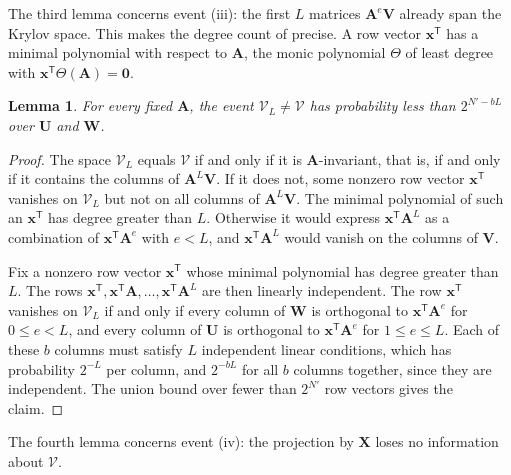 \documentclass[b5paper, 10pt, abstract=true, captions=tableheading]{scrartcl}
\theoremstyle{plain}
\newtheorem{lemma}{Lemma}
\theoremstyle{definition}
\newcommand{\tr}{\mathsf{T}}
\renewcommand{\vec}[1]{\symbf{#1}}
\newcommand{\mat}[1]{\symbf{#1}}
\begin{document}
The third lemma concerns event (iii): the first $L$ matrices
$\mat A^e\mat V$ already span the Krylov space. This makes the degree
count of  precise. A row vector $\vec x^\tr$
has a minimal polynomial with respect to $\mat A$, the monic polynomial
$\Theta$ of least degree with $\vec x^\tr\Theta(\mat A)=\vec 0$.

\begin{lemma}\label{lem:wiedemann-right}
For every fixed $\mat A$, the event $\mathcal V_L\neq\mathcal V$ has
probability less than $2^{N'-bL}$ over $\mat U$ and $\mat W$.
\end{lemma}
\begin{proof}
The space $\mathcal V_L$ equals $\mathcal V$ if and only if it is
$\mat A$-invariant, that is, if and only if it contains the columns of
$\mat A^L\mat V$. If it does not, some nonzero row vector $\vec x^\tr$
vanishes on $\mathcal V_L$ but not on all columns of $\mat A^L\mat V$. The
minimal polynomial of such an $\vec x^\tr$ has degree greater than $L$.
Otherwise it would express $\vec x^\tr\mat A^L$ as a combination of
$\vec x^\tr\mat A^{e}$ with $e<L$, and $\vec x^\tr\mat A^L$ would vanish
on the columns of $\mat V$.

Fix a nonzero row vector $\vec x^\tr$ whose minimal polynomial has degree
greater than $L$. The rows
$\vec x^\tr,\vec x^\tr\mat A,\ldots,\vec x^\tr\mat A^L$ are then linearly
independent. The row $\vec x^\tr$ vanishes on $\mathcal V_L$ if and only if
every column of $\mat W$ is orthogonal to $\vec x^\tr\mat A^e$ for
$0\leq e<L$, and every column of $\mat U$ is orthogonal to
$\vec x^\tr\mat A^e$ for $1\leq e\leq L$. Each of these
$b$ columns must satisfy $L$ independent linear conditions, which has
probability $2^{-L}$ per column, and $2^{-bL}$ for all $b$ columns
together, since they are independent. The union bound over fewer than $2^{N'}$
row vectors gives the claim.
\end{proof}

The fourth lemma concerns event (iv): the projection by $\mat X$ loses no
information about $\mathcal V$.
\end{document}
